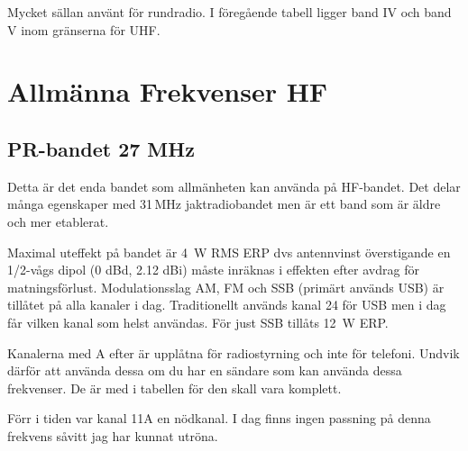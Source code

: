 Mycket sällan använt för rundradio.
I föregående tabell ligger band IV och band V inom gränserna för UHF.

\section{Allmänna Frekvenser HF}

\subsection{PR-bandet 27 MHz}

Detta är det enda bandet som allmänheten kan använda på HF-bandet. Det delar
många egenskaper med 31\,MHz jaktradiobandet men är ett band som är äldre och
mer etablerat.

Maximal uteffekt på bandet är 4~W RMS ERP dvs antennvinst överstigande en
1/2-vågs dipol (0 dBd, 2.12 dBi) måste inräknas i effekten efter avdrag för
matningsförlust. Modulationsslag AM, FM och SSB (primärt används USB) är
tillåtet på alla kanaler i dag. Traditionellt används kanal 24 för USB men i
dag får vilken kanal som helst användas. För just SSB tillåts 12~W ERP.

Kanalerna med A efter är upplåtna för radiostyrning och inte för telefoni.
Undvik därför att använda dessa om du har en sändare som kan använda dessa
frekvenser. De är med i tabellen för den skall vara komplett.

Förr i tiden var kanal 11A en nödkanal. I dag finns ingen passning på denna
frekvens såvitt jag har kunnat utröna.


